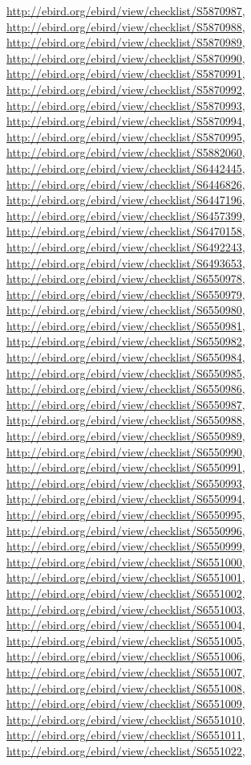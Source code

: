 \documentclass[9pt, article]{memoir}
\begin{document}
\begin{multicols}{2}
\url{http://ebird.org/ebird/view/checklist/S5870987}, 
\url{http://ebird.org/ebird/view/checklist/S5870988}, 
\url{http://ebird.org/ebird/view/checklist/S5870989}, 
\url{http://ebird.org/ebird/view/checklist/S5870990}, 
\url{http://ebird.org/ebird/view/checklist/S5870991}, 
\url{http://ebird.org/ebird/view/checklist/S5870992}, 
\url{http://ebird.org/ebird/view/checklist/S5870993}, 
\url{http://ebird.org/ebird/view/checklist/S5870994}, 
\url{http://ebird.org/ebird/view/checklist/S5870995}, 
\url{http://ebird.org/ebird/view/checklist/S5882060}, 
\url{http://ebird.org/ebird/view/checklist/S6442445}, 
\url{http://ebird.org/ebird/view/checklist/S6446826}, 
\url{http://ebird.org/ebird/view/checklist/S6447196}, 
\url{http://ebird.org/ebird/view/checklist/S6457399}, 
\url{http://ebird.org/ebird/view/checklist/S6470158}, 
\url{http://ebird.org/ebird/view/checklist/S6492243}, 
\url{http://ebird.org/ebird/view/checklist/S6493653}, 
\url{http://ebird.org/ebird/view/checklist/S6550978}, 
\url{http://ebird.org/ebird/view/checklist/S6550979}, 
\url{http://ebird.org/ebird/view/checklist/S6550980}, 
\url{http://ebird.org/ebird/view/checklist/S6550981}, 
\url{http://ebird.org/ebird/view/checklist/S6550982}, 
\url{http://ebird.org/ebird/view/checklist/S6550984}, 
\url{http://ebird.org/ebird/view/checklist/S6550985}, 
\url{http://ebird.org/ebird/view/checklist/S6550986}, 
\url{http://ebird.org/ebird/view/checklist/S6550987}, 
\url{http://ebird.org/ebird/view/checklist/S6550988}, 
\url{http://ebird.org/ebird/view/checklist/S6550989}, 
\url{http://ebird.org/ebird/view/checklist/S6550990}, 
\url{http://ebird.org/ebird/view/checklist/S6550991}, 
\url{http://ebird.org/ebird/view/checklist/S6550993}, 
\url{http://ebird.org/ebird/view/checklist/S6550994}, 
\url{http://ebird.org/ebird/view/checklist/S6550995}, 
\url{http://ebird.org/ebird/view/checklist/S6550996}, 
\url{http://ebird.org/ebird/view/checklist/S6550999}, 
\url{http://ebird.org/ebird/view/checklist/S6551000}, 
\url{http://ebird.org/ebird/view/checklist/S6551001}, 
\url{http://ebird.org/ebird/view/checklist/S6551002}, 
\url{http://ebird.org/ebird/view/checklist/S6551003}, 
\url{http://ebird.org/ebird/view/checklist/S6551004}, 
\url{http://ebird.org/ebird/view/checklist/S6551005}, 
\url{http://ebird.org/ebird/view/checklist/S6551006}, 
\url{http://ebird.org/ebird/view/checklist/S6551007}, 
\url{http://ebird.org/ebird/view/checklist/S6551008}, 
\url{http://ebird.org/ebird/view/checklist/S6551009}, 
\url{http://ebird.org/ebird/view/checklist/S6551010}, 
\url{http://ebird.org/ebird/view/checklist/S6551011}, 
\url{http://ebird.org/ebird/view/checklist/S6551022}, 

\end{multicols}
\end{document}
